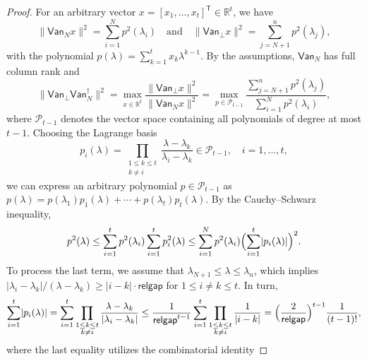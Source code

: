 \documentclass{siamart190516}
\newcommand{\Ttran}{\mathsf{T}}
\newcommand{\van}{\mathsf{Van}}
\newcommand{\R}{\mathbb{R}}
\newcommand{\gap}{\mathsf{relgap}}
\providecommand{\abs}[1]{\lvert#1\rvert}
\providecommand{\norm}[1]{\lVert#1\rVert}
\begin{document}
\begin{proof}
For an arbitrary vector $x = [x_{1},\dotsc,x_{t}]^{\Ttran}\in\R^{t}$, we have
    \begin{equation*}
        \norm{\van_{N}x}^{2} = \sum_{i=1}^{N}p^{2}(\lambda_{i})
        \quad \text{and} \quad 
        \norm{\van_{\perp}x}^{2} = \sum_{j=N+1}^{n}p^{2}(\lambda_{j}),
    \end{equation*}
    with the polynomial $p(\lambda) = \sum_{k=1}^{t}x_{k}\lambda^{k-1}$. By the assumptions, 
$\van_{N}$ has full column rank and
    \begin{equation}
        \label{estvan1}
        \norm{\van_{\perp}\van_{N}^{\dagger}}^{2} = \max_{x\in \R^{t}}\frac{\norm{\van_{\perp}x}^{2}}{\norm{\van_{N}x}^{2}} = \max_{p\in \mathcal{P}_{t-1}}\frac{\sum_{j=N+1}^{n}p^{2}(\lambda_{j})}{\sum_{i=1}^{N}p^{2}(\lambda_{i})},
    \end{equation} 
    where $\mathcal{P}_{t-1}$ denotes the vector space containing all polynomials of degree at most $t-1$. Choosing the Lagrange basis 
    \[
        p_{i}(\lambda) = \prod_{\substack{1\leq k\leq t\\ k\neq i}}\frac{\lambda-\lambda_{k}}{\lambda_{i}-\lambda_{k}}\in\mathcal{P}_{t-1}, \quad i = 1, \dotsc, t,
    \] 
    we can express an arbitrary polynomial $p\in\mathcal{P}_{t-1}$ as
    $
        p(\lambda) = p(\lambda_{1})p_{1}(\lambda) + \dotsb  + p(\lambda_{t})p_{t}(\lambda).
    $
    By the Cauchy--Schwarz inequality,
    \begin{equation} \label{eq:cauchyschwartz}
        p^{2}(\lambda) \leq \sum_{i=1}^{t}p^{2}(\lambda_{i})\sum_{i=1}^{t}p_{i}^{2}(\lambda)
        \leq \sum_{i=1}^{N}p^{2}(\lambda_{i})\Bigl(\sum_{i=1}^{t}\abs{p_{i}(\lambda)}\Bigr)^{2}.
    \end{equation}
    To process the last term, we assume that $\lambda_{N+1}\leq \lambda\leq \lambda_{n}$, which implies 
$\abs{\lambda_{i}-\lambda_{k}}/(\lambda-\lambda_{k})\geq \abs{i-k}\cdot\gap$ for $1\leq i\neq k\leq t$. In turn,
    \begin{equation*}
        \sum_{i=1}^{t}\abs{p_{i}(\lambda)}=\sum_{i=1}^{t}\prod_{\substack{1\leq k\leq t\\ k\neq i}}\frac{\lambda-\lambda_{k}}{\abs{\lambda_{i}-\lambda_{k}}}\leq \frac{1}{\gap^{t-1}}\sum_{i=1}^{t}\prod_{\substack{1\leq k\leq t\\ k\neq i}}\frac{1}{\abs{i-k}} = \Bigl(\frac{2}{\gap}\Bigr)^{t-1}\frac{1}{(t-1)!},
    \end{equation*}
    where the last equality utilizes the combinatorial identity

\end{proof}
\end{document}
